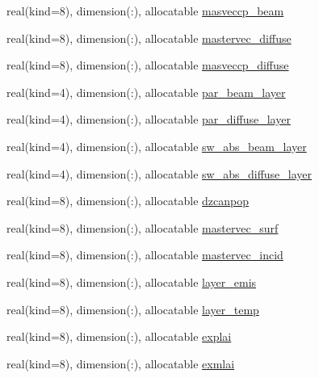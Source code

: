 \begin{DoxyCompactItemize}
\item 
real(kind=8), dimension(\+:), allocatable \hyperlink{namespacecanopy__layer__coms_aa497d207474180b1a8215250f6286485}{masveccp\+\_\+beam}
\item 
real(kind=8), dimension(\+:), allocatable \hyperlink{namespacecanopy__layer__coms_a537b438ef5e2426f6492828a07cc39bf}{mastervec\+\_\+diffuse}
\item 
real(kind=8), dimension(\+:), allocatable \hyperlink{namespacecanopy__layer__coms_a5829c4d720040869057cadfcf66e9a7c}{masveccp\+\_\+diffuse}
\item 
real(kind=4), dimension(\+:), allocatable \hyperlink{namespacecanopy__layer__coms_ab82446f080b96462d61f0c057b74b0dc}{par\+\_\+beam\+\_\+layer}
\item 
real(kind=4), dimension(\+:), allocatable \hyperlink{namespacecanopy__layer__coms_ae8f5c50b386e8289dcc0bbe7e46713ab}{par\+\_\+diffuse\+\_\+layer}
\item 
real(kind=4), dimension(\+:), allocatable \hyperlink{namespacecanopy__layer__coms_a4b21c624d201e29290a77720b7147889}{sw\+\_\+abs\+\_\+beam\+\_\+layer}
\item 
real(kind=4), dimension(\+:), allocatable \hyperlink{namespacecanopy__layer__coms_ae4a19c01890d5696c625e6ec5c9f4760}{sw\+\_\+abs\+\_\+diffuse\+\_\+layer}
\item 
real(kind=8), dimension(\+:), allocatable \hyperlink{namespacecanopy__layer__coms_a2b048c0b2ff8eb8727cf9f8fe03106ce}{dzcanpop}
\item 
real(kind=8), dimension(\+:), allocatable \hyperlink{namespacecanopy__layer__coms_a8c414dd93e4a31f9c12fcd5f0dc58f98}{mastervec\+\_\+surf}
\item 
real(kind=8), dimension(\+:), allocatable \hyperlink{namespacecanopy__layer__coms_a591c2a154e305174ee01a6196c232957}{mastervec\+\_\+incid}
\item 
real(kind=8), dimension(\+:), allocatable \hyperlink{namespacecanopy__layer__coms_a483cdd99866eb34306b571c8a5929715}{layer\+\_\+emis}
\item 
real(kind=8), dimension(\+:), allocatable \hyperlink{namespacecanopy__layer__coms_a667b5b823a4ed89a6702be1e2589a645}{layer\+\_\+temp}
\item 
real(kind=8), dimension(\+:), allocatable \hyperlink{namespacecanopy__layer__coms_a5a321ac712c5b4936ce085767be7c552}{explai}
\item 
real(kind=8), dimension(\+:), allocatable \hyperlink{namespacecanopy__layer__coms_adf87d856a2233be223d80f826188f492}{exmlai}
\item 

\end{DoxyCompactItemize}

